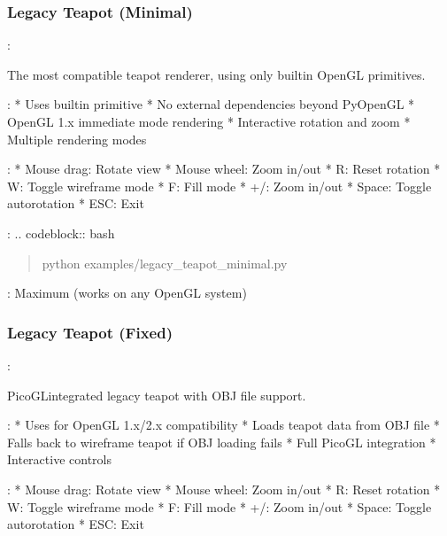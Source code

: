 \documentclass[a4paper,10pt,english,openany,oneside]{sphinxmanual}
\begin{document}
\subsubsection{Legacy Teapot (Minimal)}
\label{\detokenize{legacy_examples:legacy-teapot-minimal}}
\sphinxAtStartPar
{}: 

\sphinxAtStartPar
The most compatible teapot renderer, using only built\sphinxhyphen{}in OpenGL primitives.

\sphinxAtStartPar
{}:
* Uses  built\sphinxhyphen{}in primitive
* No external dependencies beyond PyOpenGL
* OpenGL 1.x immediate mode rendering
* Interactive rotation and zoom
* Multiple rendering modes

\sphinxAtStartPar
{}:
* Mouse drag: Rotate view
* Mouse wheel: Zoom in/out
* R: Reset rotation
* W: Toggle wireframe mode
* F: Fill mode
* +/\sphinxhyphen{}: Zoom in/out
* Space: Toggle auto\sphinxhyphen{}rotation
* ESC: Exit

\sphinxAtStartPar
{}:
.. code\sphinxhyphen{}block:: bash
\begin{quote}

\sphinxAtStartPar
python examples/legacy\_teapot\_minimal.py
\end{quote}

\sphinxAtStartPar
{}: Maximum (works on any OpenGL system)


\subsubsection{Legacy Teapot (Fixed)}
\label{\detokenize{legacy_examples:legacy-teapot-fixed}}
\sphinxAtStartPar
{}: 

\sphinxAtStartPar
PicoGL\sphinxhyphen{}integrated legacy teapot with OBJ file support.

\sphinxAtStartPar
{}:
* Uses  for OpenGL 1.x/2.x compatibility
* Loads teapot data from OBJ file
* Falls back to wireframe teapot if OBJ loading fails
* Full PicoGL integration
* Interactive controls

\sphinxAtStartPar
{}:
* Mouse drag: Rotate view
* Mouse wheel: Zoom in/out
* R: Reset rotation
* W: Toggle wireframe mode
* F: Fill mode
* +/\sphinxhyphen{}: Zoom in/out
* Space: Toggle auto\sphinxhyphen{}rotation
* ESC: Exit
\end{document}
